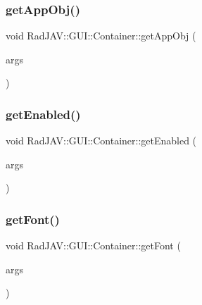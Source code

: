 \subsubsection{\texorpdfstring{get\+App\+Obj()}{getAppObj()}}
{\footnotesize\ttfamily void Rad\+J\+A\+V\+::\+G\+U\+I\+::\+Container\+::get\+App\+Obj (\begin{DoxyParamCaption}\item[{const v8\+::\+Function\+Callback\+Info$<$ v8\+::\+Value $>$ \&}]{args }\end{DoxyParamCaption})\hspace{0.3cm}{\ttfamily [static]}}

\mbox{\label{class_rad_j_a_v_1_1_g_u_i_1_1_container_aa0758b77b1641aafe973ad7b6acd8ab8}} 
\subsubsection{\texorpdfstring{get\+Enabled()}{getEnabled()}}
{\footnotesize\ttfamily void Rad\+J\+A\+V\+::\+G\+U\+I\+::\+Container\+::get\+Enabled (\begin{DoxyParamCaption}\item[{const v8\+::\+Function\+Callback\+Info$<$ v8\+::\+Value $>$ \&}]{args }\end{DoxyParamCaption})\hspace{0.3cm}{\ttfamily [static]}}

\mbox{\label{class_rad_j_a_v_1_1_g_u_i_1_1_container_ac29c0e063ee530c5f22157327c88d758}} 
\subsubsection{\texorpdfstring{get\+Font()}{getFont()}}
{\footnotesize\ttfamily void Rad\+J\+A\+V\+::\+G\+U\+I\+::\+Container\+::get\+Font (\begin{DoxyParamCaption}\item[{const v8\+::\+Function\+Callback\+Info$<$ v8\+::\+Value $>$ \&}]{args }\end{DoxyParamCaption})\hspace{0.3cm}{\ttfamily [static]}}

